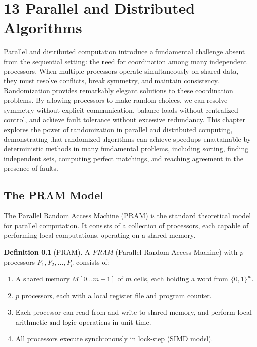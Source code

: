 \documentclass[twoside,12pt]{book}
\theoremstyle{plain}
\theoremstyle{definition}
\newtheorem{definition}[theorem]{Definition}
\theoremstyle{remark}
\begin{document}
\chapter*{13 Parallel and Distributed Algorithms}
\label{ch:parallel}

Parallel and distributed computation introduce a fundamental challenge absent from the sequential setting: the need for coordination among many independent processors. When multiple processors operate simultaneously on shared data, they must resolve conflicts, break symmetry, and maintain consistency. Randomization provides remarkably elegant solutions to these coordination problems. By allowing processors to make random choices, we can resolve symmetry without explicit communication, balance loads without centralized control, and achieve fault tolerance without excessive redundancy. This chapter explores the power of randomization in parallel and distributed computing, demonstrating that randomized algorithms can achieve speedups unattainable by deterministic methods in many fundamental problems, including sorting, finding independent sets, computing perfect matchings, and reaching agreement in the presence of faults.

\section{The PRAM Model}
\label{sec:pram}

The Parallel Random Access Machine (PRAM) is the standard theoretical model for parallel computation. It consists of a collection of processors, each capable of performing local computations, operating on a shared memory.

\begin{definition}[PRAM]
\label{def:pram}
A \emph{PRAM} (Parallel Random Access Machine) with $p$ processors $P_1, P_2, \ldots, P_p$ consists of:
\begin{enumerate}[label=(\roman*)]
\item A shared memory $M[0 \ldots m-1]$ of $m$ cells, each holding a word from $\{0, 1\}^w$.
\item $p$ processors, each with a local register file and program counter.
\item Each processor can read from and write to shared memory, and perform local arithmetic and logic operations in unit time.
\item All processors execute synchronously in lock-step (SIMD model).
\end{enumerate}
\end{definition}
\end{document}
